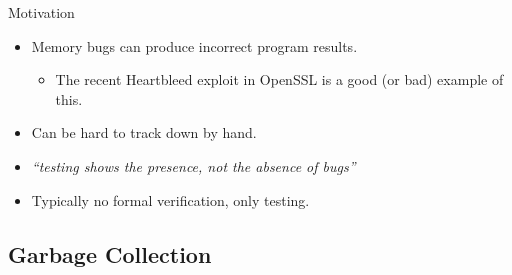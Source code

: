 \documentclass[usenames,dvipsnames]{beamer}
\begin{document}
\begin{frame}{Motivation}
  \begin{itemize}
  \item Memory bugs can produce incorrect program results.
    \begin{itemize}
    \item The recent Heartbleed exploit in OpenSSL is a good (or bad)
      example of this.
    \end{itemize}
  \item Can be hard to track down by hand.
  \item \textit{``testing shows the presence, not the absence of
      bugs''}
  \item Typically no formal verification, only testing.
  \end{itemize}



\end{frame}

\subsection{Garbage Collection}
\end{document}
